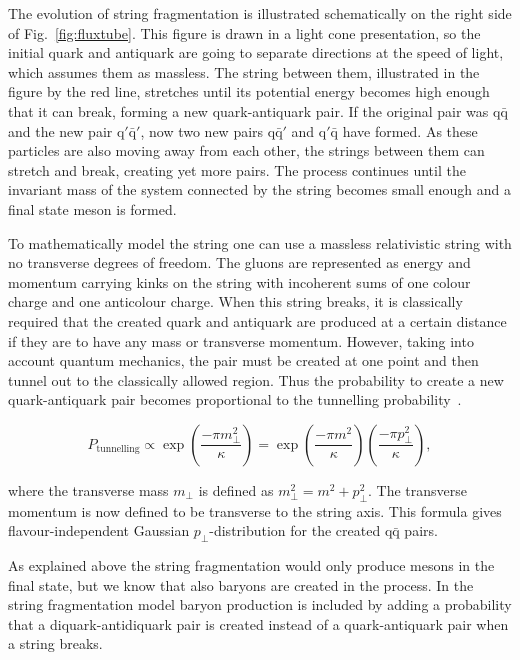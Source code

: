 The evolution of string fragmentation is illustrated schematically on the right side of Fig.~\ref{fig:fluxtube}. This figure is drawn in a light cone presentation, so the initial quark and antiquark are going to separate directions at the speed of light, which assumes them as massless. The string between them, illustrated in the figure by the red line, stretches until its potential energy becomes high enough that it can break, forming a new quark-antiquark pair. If the original pair was $\mathrm{q \bar q}$ and the new pair $\mathrm{q'\bar q'}$, now two new pairs $\mathrm{q \bar q'}$ and $\mathrm{q'\bar q}$ have formed. As these particles are also moving away from each other, the strings between them can stretch and break, creating yet more pairs. The process continues until the invariant mass of the system connected by the string becomes small enough and a final state meson is formed. 

To mathematically model the string one can use a massless relativistic string with no transverse degrees of freedom. The gluons are represented as energy and momentum carrying kinks on the string with incoherent sums of one colour charge and one anticolour charge. When this string breaks, it is classically required that the created quark and antiquark are produced at a certain distance if they are to have any mass or transverse momentum. However, taking into account quantum mechanics, the pair must be created at one point and then tunnel out to the classically allowed region. Thus the probability to create a new quark-antiquark pair becomes proportional to the tunnelling probability~\cite{ANDERSSON198331}.


\begin{equation}
P_\mathrm{tunnelling} \propto \exp \left(\frac{-\pi m_\perp^2}{\kappa} \right) = \exp \left(\frac{-\pi m^2}{\kappa} \right) \left(\frac{-\pi p_\perp^2}{\kappa} \right),
\end{equation}

\noindent where the transverse mass $m_\perp$ is defined as $m_\perp^2 = m^2 + p_\perp ^2$. The transverse momentum is now defined to be transverse to the string axis. This formula gives flavour-independent Gaussian $p_\perp$-distribution for the created $\mathrm{q \bar q}$ pairs.

As explained above the string fragmentation would only produce mesons in the final state, but we know that also baryons are created in the process. In the string fragmentation model baryon production is included by adding a probability that a diquark-antidiquark pair is created instead of a quark-antiquark pair when a string breaks.

